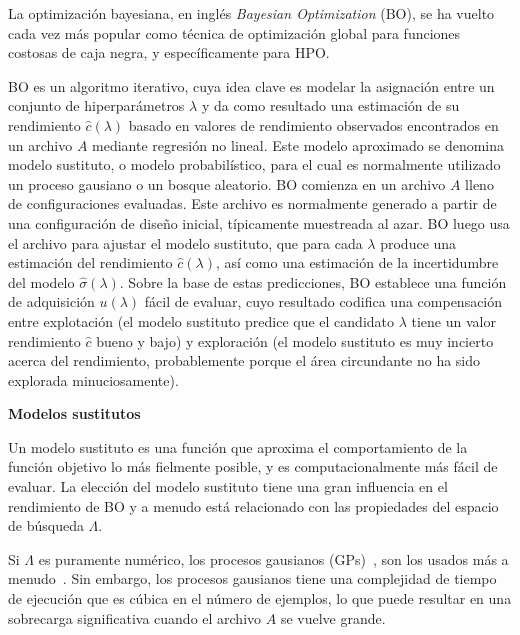 La optimización bayesiana, en inglés \textit{Bayesian Optimization} (BO), se ha vuelto cada vez más popular como técnica de optimización global para funciones costosas de caja negra, y específicamente para HPO.

BO es un algoritmo iterativo, cuya idea clave es modelar la asignación entre un conjunto de hiperparámetros $\lambda$ y da como resultado una estimación de su rendimiento $\hat{c}(\lambda)$ basado en valores de rendimiento observados encontrados en un archivo $A$ mediante regresión no lineal. Este modelo aproximado se denomina modelo sustituto, o modelo probabilístico, para el cual es normalmente utilizado un proceso gausiano o un bosque aleatorio. BO comienza en un archivo $A$ lleno de configuraciones evaluadas. Este archivo es normalmente generado a partir de una configuración de diseño inicial, típicamente muestreada al azar. BO luego usa el archivo para ajustar el modelo sustituto, que para cada $\lambda$ produce una estimación del rendimiento $\hat{c}(\lambda)$, así como una estimación de la incertidumbre del modelo $\hat{\sigma}(\lambda)$. Sobre la base de estas predicciones, BO establece una función de adquisición $u(\lambda)$ fácil de evaluar, cuyo resultado codifica una compensación entre explotación (el modelo sustituto predice que el candidato $\lambda$ tiene un valor rendimiento $\hat{c}$ bueno y bajo) y exploración (el modelo sustituto es muy incierto acerca del rendimiento, probablemente porque el área circundante no ha sido explorada minuciosamente).

\quad

\textbf{Modelos sustitutos}

\quad

Un modelo sustituto es una función que aproxima el comportamiento de la función objetivo lo más fielmente posible, y es computacionalmente más fácil de evaluar. La elección del modelo sustituto tiene una gran influencia en el rendimiento de BO y a menudo está relacionado con las propiedades del espacio de búsqueda $\Lambda$. 

Si $\Lambda$ es puramente numérico, los procesos gausianos (GPs)~\cite{rasmussen2005gaussian}, son los usados más a menudo~\cite{bischl2021hyperparameter}. Sin embargo, los procesos gausianos tiene una complejidad de tiempo de ejecución que es cúbica en el número de ejemplos, lo que puede resultar en una sobrecarga significativa cuando el archivo $A$ se vuelve grande.

